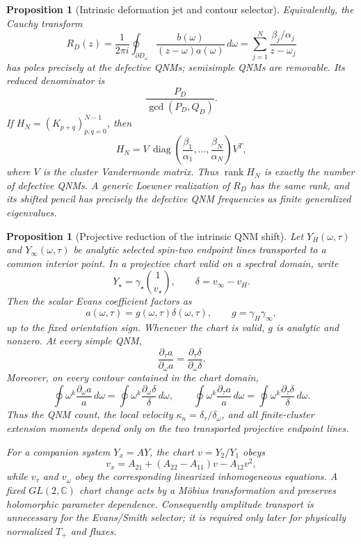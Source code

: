 \documentclass[11pt]{article}
\newtheorem{proposition}[theorem]{Proposition}
\theoremstyle{definition}
\theoremstyle{remark}
\begin{document}
\begin{proposition}[Intrinsic deformation jet and contour selector]
Equivalently, the Cauchy transform
\[
 R_D(z)=\frac1{2\pi i}
 \oint_{\partial D_\omega}
 \frac{b(\omega)}
 {(z-\omega)a(\omega)}\,d\omega
 =\sum_{j=1}^N
 \frac{\beta_j/\alpha_j}{z-\omega_j}
\]
has poles precisely at the defective QNMs; semisimple QNMs are removable.
Its reduced denominator is
\[
 \frac{P_D}{\gcd(P_D,Q_D)}.
\]
If \(H_N=(K_{p+q})_{p,q=0}^{N-1}\), then
\[
 H_N=V\,
 \operatorname{diag}\!\left(
 \frac{\beta_1}{\alpha_1},\ldots,\frac{\beta_N}{\alpha_N}
 \right)V^T,
\]
where \(V\) is the cluster Vandermonde matrix.  Thus
\(\operatorname{rank}H_N\) is exactly the number of defective QNMs.
A generic Loewner realization of \(R_D\) has the same rank, and its shifted
pencil has precisely the defective QNM frequencies as finite generalized
eigenvalues.
\end{proposition}

\begin{proposition}[Projective reduction of the intrinsic QNM shift]
\label{prop:axial-qnm-projective-shift}
Let \(Y_H(\omega,\tau)\) and \(Y_\infty(\omega,\tau)\) be analytic selected
spin-two endpoint lines transported to a common interior point.  In a
projective chart valid on a spectral domain, write
\[
 Y_\star=\gamma_\star\binom{1}{v_\star},
 \qquad
 \delta=v_\infty-v_H .
\]
Then the scalar Evans coefficient factors as
\[
 a(\omega,\tau)=g(\omega,\tau)\delta(\omega,\tau),
 \qquad g=\gamma_H\gamma_\infty,
\]
up to the fixed orientation sign.  Whenever the chart is valid,
\(g\) is analytic and nonzero.  At every simple QNM,
\[
 \frac{\partial_\tau a}{\partial_\omega a}
 =
 \frac{\partial_\tau\delta}{\partial_\omega\delta}.
\]
Moreover, on every contour contained in the chart domain,
\[
 \oint\omega^k\frac{\partial_\omega a}{a}\,d\omega
 =
 \oint\omega^k\frac{\partial_\omega\delta}{\delta}\,d\omega,
 \qquad
 \oint\omega^k\frac{\partial_\tau a}{a}\,d\omega
 =
 \oint\omega^k\frac{\partial_\tau\delta}{\delta}\,d\omega .
\]
Thus the QNM count, the local velocity
\(\kappa_n=\delta_\tau/\delta_\omega\), and all finite-cluster extension
moments depend only on the two transported projective endpoint lines.

For a companion system \(Y_x=A Y\), the chart
\(v=Y_2/Y_1\) obeys
\[
 v_x=A_{21}+(A_{22}-A_{11})v-A_{12}v^2,
\]
while \(v_\tau\) and \(v_\omega\) obey the corresponding linearized
inhomogeneous equations.  A fixed \(GL(2,\mathbb C)\) chart change acts by a
M\"obius transformation and preserves holomorphic parameter dependence.
Consequently amplitude transport is unnecessary for the Evans/Smith
selector; it is required only later for physically normalized \(T_+\) and
fluxes.
\end{proposition}
\end{document}
